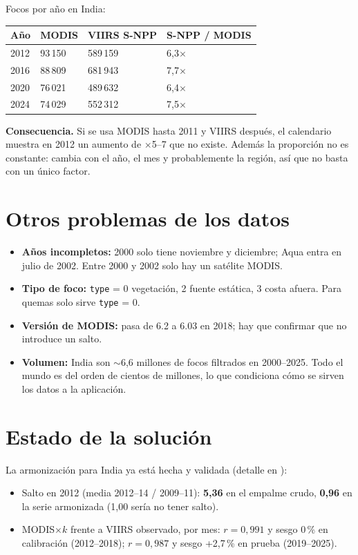 Focos por año en India:

\begin{tabularx}{\linewidth}{@{}XXXX@{}}
\toprule
Año & MODIS & VIIRS S-NPP & S-NPP / MODIS \\
\midrule
2012 & 93\,150 & 589\,159 & 6,3$\times$ \\
2016 & 88\,809 & 681\,943 & 7,7$\times$ \\
2020 & 76\,021 & 489\,632 & 6,4$\times$ \\
2024 & 74\,029 & 552\,312 & 7,5$\times$ \\
\bottomrule
\end{tabularx}

\textbf{Consecuencia.} Si se usa MODIS hasta 2011 y VIIRS después, el calendario muestra
en 2012 un aumento de $\times$5--7 que no existe. Además la proporción no es constante:
cambia con el año, el mes y probablemente la región, así que no basta con un único
factor.

\section{Otros problemas de los datos}

\begin{itemize}
  \item \textbf{Años incompletos:} 2000 solo tiene noviembre y diciembre; Aqua entra en
        julio de 2002. Entre 2000 y 2002 solo hay un satélite MODIS.
  \item \textbf{Tipo de foco:} \texttt{type} = 0 vegetación, 2 fuente estática,
        3 costa afuera. Para quemas solo sirve \texttt{type} = 0.
  \item \textbf{Versión de MODIS:} pasa de 6.2 a 6.03 en 2018; hay que confirmar que no
        introduce un salto.
  \item \textbf{Volumen:} India son $\sim$6,6 millones de focos filtrados en 2000--2025.
        Todo el mundo es del orden de cientos de millones, lo que condiciona cómo se
        sirven los datos a la aplicación.
\end{itemize}

\section{Estado de la solución}

La armonización para India ya está hecha y validada (detalle en
):

\begin{itemize}
  \item Salto en 2012 (media 2012--14 / 2009--11): \textbf{5,36} en el empalme crudo,
        \textbf{0,96} en la serie armonizada (1,00 sería no tener salto).
  \item MODIS$\times k$ frente a VIIRS observado, por mes: $r = 0{,}991$ y sesgo 0\,\%
        en calibración (2012--2018); $r = 0{,}987$ y sesgo +2,7\,\% en prueba (2019--2025).
\end{itemize}
